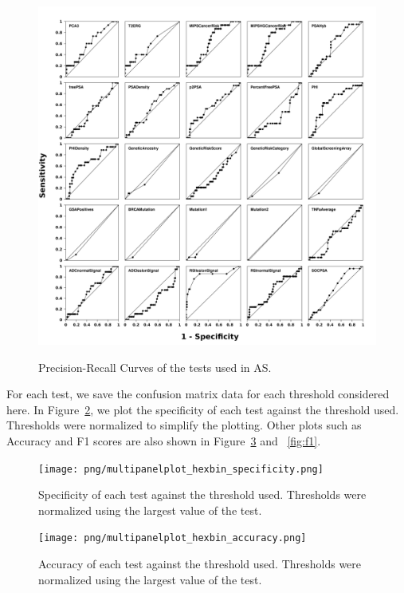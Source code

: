 \documentclass[]{article}
\begin{document}
\begin{figure}
\centering
    \includegraphics[width=140mm]{png/multipanelploprt_roc.png} \\
\caption{Precision-Recall Curves of the tests used in AS.}
\label{fig:roc_plot}
\end{figure}

\noindent For each test, we save the confusion matrix data for each threshold considered here. In Figure~\ref{fig:specificity},
we plot the specificity of each test against the threshold used.  Thresholds were normalized to simplify the plotting. 
Other plots such as Accuracy and F1 scores are also shown in Figure~\ref{fig:accuracy} and ~\ref{fig:f1}. \\

\begin{figure}
\centering
    \texttt{[image: png/multipanelplot\_hexbin\_specificity.png]} \\
\caption{Specificity of each test against the threshold used.  Thresholds were normalized using the largest value of the test.}
\label{fig:specificity}
\end{figure}

\begin{figure}
\centering
    \texttt{[image: png/multipanelplot\_hexbin\_accuracy.png]} \\
\caption{Accuracy of each test against the threshold used.  Thresholds were normalized using the largest value of the test.}
\label{fig:accuracy}
\end{figure}
\end{document}
